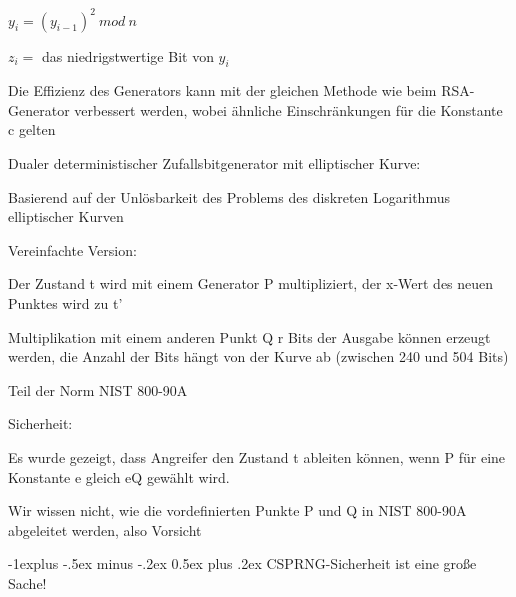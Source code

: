 \documentclass[a4paper]{article}
\makeatletter
\renewcommand{\subsection}{\@startsection{subsection}{2}{0mm}%
 {-1explus -.5ex minus -.2ex}%
 {0.5ex plus .2ex}%
 {\normalfont\normalsize\bfseries}}
\makeatother
\begin{document}
\begin{multicols}{3}
\begin{itemize*}
\begin{enumerate*}
                  \begin{enumerate*} \def\labelenumii{\arabic{enumii}.} \item $y_i = (y_{i-1})^2\ mod\ n$ \item $z_i =$ das niedrigstwertige Bit von $y_i$ \end{enumerate*}
            \end{enumerate*}
            \begin{itemize*}
                  \item Die Effizienz des Generators kann mit der gleichen Methode wie beim RSA-Generator verbessert werden, wobei ähnliche Einschränkungen für die Konstante c gelten
            \end{itemize*}
            \item Dualer deterministischer Zufallsbitgenerator mit elliptischer Kurve:
            \begin{itemize*}
                  \item Basierend auf der Unlösbarkeit des Problems des diskreten Logarithmus elliptischer Kurven
                  \item Vereinfachte Version: %
                  \item Der Zustand t wird mit einem Generator P multipliziert, der x-Wert des neuen Punktes wird zu t'
                  \item Multiplikation mit einem anderen Punkt Q r Bits der Ausgabe können erzeugt werden, die Anzahl der Bits hängt von der Kurve ab (zwischen 240 und 504 Bits)
                  \item Teil der Norm NIST 800-90A
                  \item Sicherheit:
                  \begin{itemize*} \item Es wurde gezeigt, dass Angreifer den Zustand t ableiten können, wenn P für eine Konstante e gleich eQ gewählt wird. \item Wir wissen nicht, wie die vordefinierten Punkte P und Q in NIST 800-90A abgeleitet werden, also Vorsicht \end{itemize*}
            \end{itemize*}
      \end{itemize*}


      \subsection{CSPRNG-Sicherheit ist eine große
            Sache!}


\end{multicols}
\end{document}
